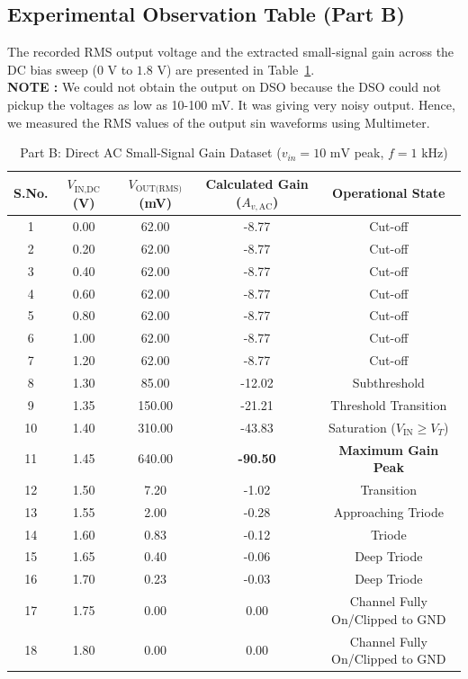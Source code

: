 \documentclass[11pt,a4paper]{article}
\begin{document}
\subsection{Experimental Observation Table (Part B)}
The recorded RMS output voltage and the extracted small-signal gain across the DC bias sweep ($0\text{ V}$ to $1.8\text{ V}$) are presented in Table~\ref{tab:part_b_readings}.\\
\textbf{NOTE : } We could not obtain the output on DSO because the DSO could not pickup the voltages as low as 10-100 mV. It was giving very noisy output. Hence, we measured the RMS values of the output sin waveforms using Multimeter.
\begin{table}[H]
\centering
\caption{Part B: Direct AC Small-Signal Gain Dataset ($v_{in} = 10\text{ mV}$ peak, $f = 1\text{ kHz}$)}\label{tab:part_b_readings}
\begin{tabular}{ccccc}
\toprule
\textbf{S.No.} & \textbf{$V_{\text{IN,DC}}$ (V)} & \textbf{$V_{\text{OUT(RMS)}}$ (mV)} & \textbf{Calculated Gain ($A_{v,\text{AC}}$)} & \textbf{Operational State} \\
\midrule
1  & 0.00 & 62.00 & -8.77  & Cut-off\\
2  & 0.20 & 62.00 & -8.77  & Cut-off \\
3  & 0.40 & 62.00 & -8.77  & Cut-off \\
4  & 0.60 & 62.00 & -8.77  & Cut-off \\
5  & 0.80 & 62.00 & -8.77  & Cut-off \\
6  & 1.00 & 62.00 & -8.77  & Cut-off \\
7  & 1.20 & 62.00 & -8.77  & Cut-off \\
8  & 1.30 & 85.00 & -12.02 & Subthreshold \\
9  & 1.35 & 150.00 & -21.21 &Threshold Transition\\
10 & 1.40 & 310.00 & -43.83 & Saturation ($V_{\text{IN}} \ge V_T$) \\
11 & 1.45 & 640.00 & \textbf{-90.50} & \textbf{Maximum Gain Peak} \\
12 & 1.50 & 7.20   & -1.02  & Transition \\
13 & 1.55 & 2.00   & -0.28  & Approaching Triode \\
14 & 1.60 & 0.83   & -0.12  & Triode \\
15 & 1.65 & 0.40   & -0.06  & Deep Triode \\
16 & 1.70 & 0.23   & -0.03  & Deep Triode \\
17 & 1.75 & 0.00   & 0.00   & Channel Fully On/Clipped to GND \\
18 & 1.80 & 0.00   & 0.00   & Channel Fully On/Clipped to GND \\
\bottomrule
\end{tabular}
\end{table}
\end{document}
